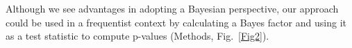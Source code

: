 \documentclass{nature}
\begin{document}
Although we see advantages in adopting a Bayesian perspective, our approach could be used in a frequentist context by calculating a Bayes factor and using it as a test statistic to compute p-values (Methods, Fig.~\ref{Fig2}).
 
\end{document}
